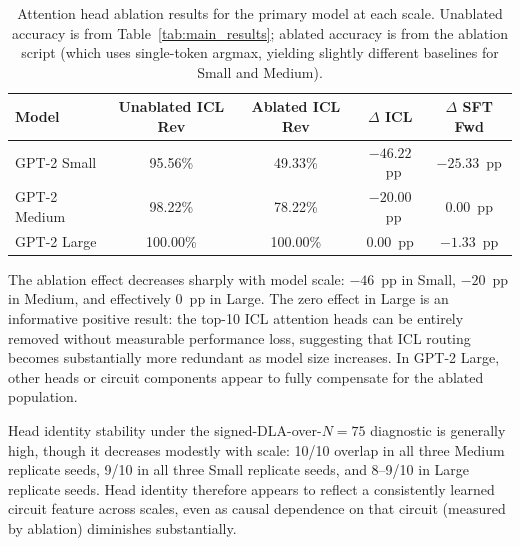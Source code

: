 \documentclass[11pt]{article}
\begin{document}
\begin{table}[H]
\centering
\caption{Attention head ablation results for the primary model at each scale.
Unablated accuracy is from Table~\ref{tab:main_results}; ablated accuracy
is from the ablation script (which uses single-token argmax, yielding slightly
different baselines for Small and Medium).}
\label{tab:ablation_cross_scale}
\begin{tabular}{lcccc}
\toprule
\textbf{Model} & \textbf{Unablated ICL Rev} & \textbf{Ablated ICL Rev} & \textbf{$\Delta$ ICL} & \textbf{$\Delta$ SFT Fwd} \\
\midrule
GPT-2 Small  & 95.56\% & 49.33\% & $-46.22$~pp & $-25.33$~pp \\
GPT-2 Medium & 98.22\% & 78.22\% & $-20.00$~pp &  0.00~pp \\
GPT-2 Large  & 100.00\% & 100.00\% & \phantom{0}$0.00$~pp &  $-1.33$~pp \\
\bottomrule
\end{tabular}
\end{table}

The ablation effect decreases sharply with model scale: $-46$~pp in Small,
$-20$~pp in Medium, and effectively $0$~pp in Large. The zero effect in Large
is an informative positive result: the top-10 ICL attention heads can be
entirely removed without measurable performance loss, suggesting that ICL
routing becomes substantially more redundant as model size increases. In GPT-2
Large, other heads or circuit components appear to fully compensate for the
ablated population.

Head identity stability under the signed-DLA-over-$N=75$ diagnostic is
generally high, though it decreases modestly with scale: 10/10 overlap in all
three Medium replicate seeds, 9/10 in all three Small replicate seeds, and
8--9/10 in Large replicate seeds. Head identity therefore appears to reflect a
consistently learned circuit feature across scales, even as causal dependence
on that circuit (measured by ablation) diminishes substantially.
\end{document}
